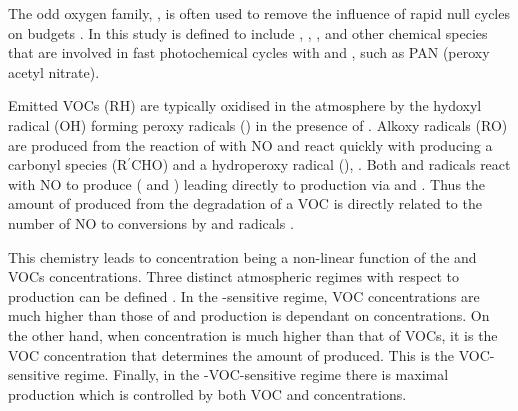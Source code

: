 The odd oxygen family, , is often used to remove the influence of rapid null cycles on  budgets \citep{Seinfeld:2006}. 
In this study  is defined to include , , ,  and other chemical species that are involved in fast photochemical cycles with  and , such as PAN (peroxy acetyl nitrate).

Emitted VOCs (RH) are typically oxidised in the atmosphere by the hydoxyl radical (OH) forming peroxy radicals () in the presence of  . 
Alkoxy radicals (RO) are produced from the reaction of  with NO  and react quickly with  producing a carbonyl species (R$^{\prime}$CHO) and a hydroperoxy radical (), .
Both  and  radicals react with NO to produce  ( and ) leading directly to  production via  and . 
Thus the amount of  produced from the degradation of a VOC is directly related to the number of NO to  conversions by  and  radicals \citep{Atkinson:2000}.
\begin{reactionlist}
\end{reactionlist}

This chemistry leads to  concentration being a non-linear function of the  and VOCs concentrations. 
Three distinct atmospheric regimes with respect to  production can be defined \citep{Jenkin:2000}. 
In the -sensitive regime, VOC concentrations are much higher than those of  and  production is dependant on  concentrations. 
On the other hand, when  concentration is much higher than that of VOCs, it is the VOC concentration that determines the amount of  produced. 
This is the VOC-sensitive regime. 
Finally, in the -VOC-sensitive regime there is maximal  production which is controlled by both VOC and  concentrations.

